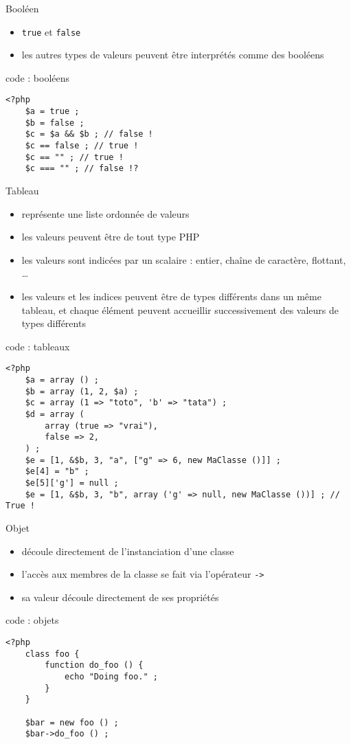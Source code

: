 \begin{frame}[containsverbatim]{Booléen}
\begin{itemize}
\item \texttt{true} et \texttt{false}
\item les autres types de valeurs peuvent être interprétés comme des booléens
\end{itemize}
\begin{block}{code : booléens}
\begin{lstlisting}
<?php
	$a = true ;
	$b = false ;
	$c = $a && $b ; // false !
	$c == false ; // true !
	$c == "" ; // true !
	$c === "" ; // false !?
\end{lstlisting}
\end{block}
\end{frame}

\begin{frame}[containsverbatim]{Tableau}
\begin{itemize}
\item représente une liste ordonnée de valeurs
\item les valeurs peuvent être de tout type PHP
\item les valeurs sont indicées par un scalaire : entier, chaîne de caractère, flottant, \ldots
\item les valeurs et les indices peuvent être de types différents dans un même tableau, et chaque élément peuvent accueillir successivement des valeurs de types différents
\end{itemize}
\begin{block}{code : tableaux}
\begin{lstlisting}
<?php
	$a = array () ;
	$b = array (1, 2, $a) ;
	$c = array (1 => "toto", 'b' => "tata") ;
	$d = array (
		array (true => "vrai"),
		false => 2,
	) ;
	$e = [1, &$b, 3, "a", ["g" => 6, new MaClasse ()]] ;
	$e[4] = "b" ;
	$e[5]['g'] = null ;
	$e = [1, &$b, 3, "b", array ('g' => null, new MaClasse ())] ; // True !
\end{lstlisting}
\end{block}
\end{frame}

\begin{frame}[containsverbatim]{Objet}
\begin{itemize}
\item découle directement de l'instanciation d'une classe
\item l'accès aux membres de la classe se fait via l'opérateur \texttt{->}
\item sa valeur découle directement de ses propriétés 
\end{itemize}
\begin{block}{code : objets}
\begin{lstlisting}
<?php
	class foo {
		function do_foo () {
			echo "Doing foo." ;
		}
	}

	$bar = new foo () ;
	$bar->do_foo () ;
\end{lstlisting}
\end{block}
\end{frame}

